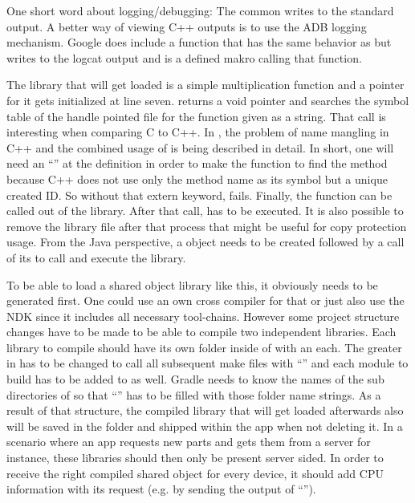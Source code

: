 One short word about logging/debugging: The common  writes to the standard output. A better way of viewing C++ outputs is to use the ADB logging mechanism. Google does include a  function that
has the same behavior as  but writes to the logcat output and 
 is a defined makro calling that function. 

The library that will get loaded is a simple multiplication function and a pointer
for it gets initialized at line seven.  returns a void pointer and
 searches the symbol table of the handle pointed file for the function
given as a string. That call is interesting when comparing C to C++. In 
\parencite{dlopen_howto}, the problem of name mangling in C++ and the combined usage of
 is being described in detail.
In short, one will need an ``'' at the  definition in order to make the  function to find the method
because C++ does not use only the method name as its symbol but a unique created ID.
So without that extern keyword,  fails.
Finally, the  function can be called out of the library.
After that call,  has to be executed. It is also possible to remove
the library file after that process that might be useful for copy protection usage.
From the Java perspective, a  object needs to be created followed by 
a call of its  to call and execute the library.

To be able to load a shared object library like this, it obviously needs to be
generated first. One could use an own cross compiler for that or just also use 
the NDK since it includes all necessary tool-chains. 
However some project structure changes have to be made to be able to compile two independent libraries. Each library to compile should have its own folder inside
of  with an  each. The greater  in
 has to be changed to call all subsequent make files with 
``'' and each module to build has to be
added to  as well. Gradle needs to know the names of the sub 
directories of  so that ``'' has to be
filled with those folder name strings. As a result of that structure, the compiled
library that will get loaded afterwards also will be saved in the  folder
and shipped within the app when not deleting it. In a scenario where an app requests new
parts and gets them from a server for instance, these libraries should then only be
present server sided. In order to receive the right compiled shared object for every
device, it should add CPU information with its request (e.g. by sending the output
of ``'').

